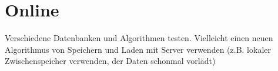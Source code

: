 \chapter{Online}\label{ch:online}

Verschiedene Datenbanken und Algorithmen testen. 
Vielleicht einen neuen Algorithmus von Speichern und Laden mit Server verwenden (z.B. lokaler Zwischenspeicher verwenden, der Daten schonmal vorlädt)
